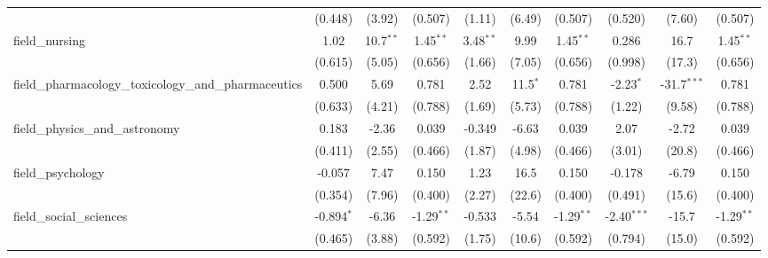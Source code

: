 \begin{tabular}{lccccccccc}
                                                               & (0.448)        & (3.92)         & (0.507)       & (1.11)        & (6.49)         & (0.507)       & (0.520)       & (7.60)        & (0.507)\\   
   field\_nursing                                              & 1.02           & 10.7$^{**}$    & 1.45$^{**}$   & 3.48$^{**}$   & 9.99           & 1.45$^{**}$   & 0.286         & 16.7          & 1.45$^{**}$\\   
                                                               & (0.615)        & (5.05)         & (0.656)       & (1.66)        & (7.05)         & (0.656)       & (0.998)       & (17.3)        & (0.656)\\   
   field\_pharmacology\_toxicology\_and\_pharmaceutics         & 0.500          & 5.69           & 0.781         & 2.52          & 11.5$^{*}$     & 0.781         & -2.23$^{*}$   & -31.7$^{***}$ & 0.781\\   
                                                               & (0.633)        & (4.21)         & (0.788)       & (1.69)        & (5.73)         & (0.788)       & (1.22)        & (9.58)        & (0.788)\\   
   field\_physics\_and\_astronomy                              & 0.183          & -2.36          & 0.039         & -0.349        & -6.63          & 0.039         & 2.07          & -2.72         & 0.039\\   
                                                               & (0.411)        & (2.55)         & (0.466)       & (1.87)        & (4.98)         & (0.466)       & (3.01)        & (20.8)        & (0.466)\\   
   field\_psychology                                           & -0.057         & 7.47           & 0.150         & 1.23          & 16.5           & 0.150         & -0.178        & -6.79         & 0.150\\   
                                                               & (0.354)        & (7.96)         & (0.400)       & (2.27)        & (22.6)         & (0.400)       & (0.491)       & (15.6)        & (0.400)\\   
   field\_social\_sciences                                     & -0.894$^{*}$   & -6.36          & -1.29$^{**}$  & -0.533        & -5.54          & -1.29$^{**}$  & -2.40$^{***}$ & -15.7         & -1.29$^{**}$\\   
                                                               & (0.465)        & (3.88)         & (0.592)       & (1.75)        & (10.6)         & (0.592)       & (0.794)       & (15.0)        & (0.592)\\   

\end{tabular}
